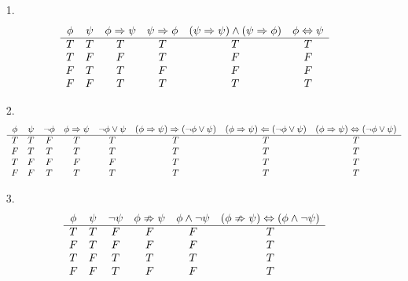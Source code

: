 \documentclass[11pt]{exam}
\author{@dantevangelista}
\begin{document}

\begin{enumerate}[leftmargin=0pt]

\item[1.]
\begin{displaymath}
    \begin{array}{c c c c c c}
        \phi & \psi & \phi \Rightarrow \psi & \psi \Rightarrow \phi & (\psi \Rightarrow \psi) \land (\psi \Rightarrow \phi) & \phi \Leftrightarrow \psi \\
        \hline
        T & T & T & T & T & T \\
        T & F & F & T & F & F \\
        F & T & T & F & F & F \\
        F & F & T & T & T & T
    \end{array}
\end{displaymath}

\item[2.]
\begin{displaymath}
    \begin{array}{c c c c c c c c}
          \phi & \psi & \neg \phi & \phi \Rightarrow \psi & \neg \phi \lor \psi & (\phi \Rightarrow \psi) \Rightarrow (\neg \phi \lor \psi) & (\phi \Rightarrow \psi) \Leftarrow (\neg \phi \lor \psi) & (\phi \Rightarrow \psi) \Leftrightarrow (\neg \phi \lor \psi) \\
          \hline
          T & T & F & T & T & T & T & T\\
          F & T & T & T & T & T & T & T\\
          T & F & F & F & F & T & T & T\\
          F & F & T & T & T & T& T & T
    \end{array}
\end{displaymath}

\item[3.]
\begin{displaymath}
    \begin{array}{c c c c c c}
        \phi & \psi & \neg \psi & \phi \nRightarrow \psi & \phi \land \neg \psi & (\phi \nRightarrow \psi) \Leftrightarrow (\phi \land \neg \psi) \\
        \hline
        T & T & F & F & F & T \\
        F & T & F & F & F & T \\
        T & F & T & T & T & T \\
        F & F & T & F & F & T 
    \end{array}
\end{displaymath}


\end{enumerate}
\end{document}
